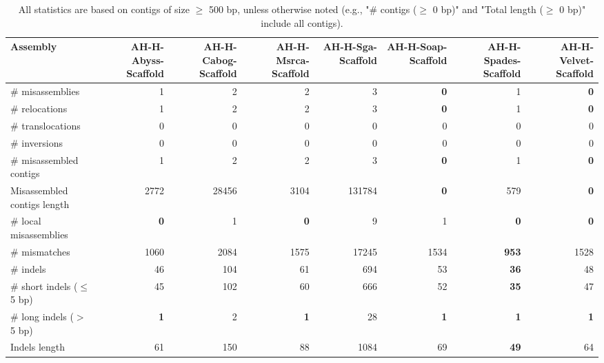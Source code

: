 \documentclass[12pt,a4paper]{article}
\begin{document}
\begin{table}[ht]
\begin{center}
\caption{All statistics are based on contigs of size $\geq$ 500 bp, unless otherwise noted (e.g., "\# contigs ($\geq$ 0 bp)" and "Total length ($\geq$ 0 bp)" include all contigs).}
\begin{tabular}{|l*{7}{|r}|}
\hline
Assembly & AH-H-Abyss-Scaffold & AH-H-Cabog-Scaffold & AH-H-Msrca-Scaffold & AH-H-Sga-Scaffold & AH-H-Soap-Scaffold & AH-H-Spades-Scaffold & AH-H-Velvet-Scaffold \\ \hline
\# misassemblies & 1 & 2 & 2 & 3 & {\bf 0} & 1 & {\bf 0} \\ \hline
\hspace{5mm}\# relocations & 1 & 2 & 2 & 3 & {\bf 0} & 1 & {\bf 0} \\ \hline
\hspace{5mm}\# translocations & 0 & 0 & 0 & 0 & 0 & 0 & 0 \\ \hline
\hspace{5mm}\# inversions & 0 & 0 & 0 & 0 & 0 & 0 & 0 \\ \hline
\# misassembled contigs & 1 & 2 & 2 & 3 & {\bf 0} & 1 & {\bf 0} \\ \hline
Misassembled contigs length & 2772 & 28456 & 3104 & 131784 & {\bf 0} & 579 & {\bf 0} \\ \hline
\# local misassemblies & {\bf 0} & 1 & {\bf 0} & 9 & 1 & {\bf 0} & {\bf 0} \\ \hline
\# mismatches & 1060 & 2084 & 1575 & 17245 & 1534 & {\bf 953} & 1528 \\ \hline
\# indels & 46 & 104 & 61 & 694 & 53 & {\bf 36} & 48 \\ \hline
\hspace{5mm}\# short indels ($\leq$ 5 bp) & 45 & 102 & 60 & 666 & 52 & {\bf 35} & 47 \\ \hline
\hspace{5mm}\# long indels ($>$ 5 bp) & {\bf 1} & 2 & {\bf 1} & 28 & {\bf 1} & {\bf 1} & {\bf 1} \\ \hline
Indels length & 61 & 150 & 88 & 1084 & 69 & {\bf 49} & 64 \\ \hline
\end{tabular}
\end{center}
\end{table}
\end{document}
